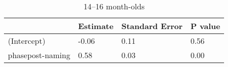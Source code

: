 


\begin{table}[tbp]

\begin{center}
\begin{threeparttable}

\caption{\label{tab:r2-cn-prepost-glmers-agegroup-tabs}14--16 month-olds}

\begin{tabular}{llll}
\toprule
 & \multicolumn{1}{c}{Estimate} & \multicolumn{1}{c}{Standard Error} & \multicolumn{1}{c}{P value}\\
\midrule
(Intercept) & -0.06 & 0.11 & 0.56\\
phasepost-naming & 0.58 & 0.03 & 0.00\\
\bottomrule
\end{tabular}

\end{threeparttable}
\end{center}

\end{table}



